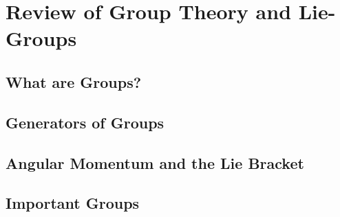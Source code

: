 \chapter{Review of Group Theory and Lie-Groups}

\section{What are Groups?}

\section{Generators of Groups}

\section{Angular Momentum and the Lie Bracket}

\section{Important Groups}
